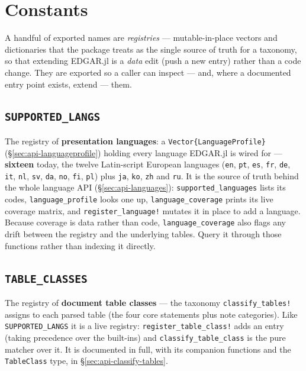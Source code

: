\documentclass[11pt,a4paper]{report}
\begin{document}
\section{Constants}
\label{sec:api-constants}

A handful of exported names are \emph{registries} --- mutable-in-place vectors and dictionaries that the
package treats as the single source of truth for a taxonomy, so that extending EDGAR.jl is a \emph{data} edit
(push a new entry) rather than a code change. They are exported so a caller can inspect --- and, where a
documented entry point exists, extend --- them.

\subsection{\texttt{SUPPORTED\_LANGS}}
\label{sec:api-supported-langs}

\noindent The registry of \textbf{presentation languages}: a \texttt{Vector\{LanguageProfile\}}
(\S\ref{sec:api-languageprofile}) holding every language EDGAR.jl is wired for --- \textbf{sixteen} today, the
twelve Latin-script European languages (\texttt{en}, \texttt{pt}, \texttt{es}, \texttt{fr}, \texttt{de},
\texttt{it}, \texttt{nl}, \texttt{sv}, \texttt{da}, \texttt{no}, \texttt{fi}, \texttt{pl}) plus \texttt{ja},
\texttt{ko}, \texttt{zh} and \texttt{ru}. It is the source of truth behind the whole language API
(\S\ref{sec:api-languages}): \texttt{supported\_languages} lists its codes, \texttt{language\_profile} looks one
up, \texttt{language\_coverage} prints its live coverage matrix, and \texttt{register\_language!} mutates it in
place to add a language. Because coverage is data rather than code, \texttt{language\_coverage} also flags any
drift between the registry and the underlying tables. Query it through those functions rather than indexing it
directly.

\subsection{\texttt{TABLE\_CLASSES}}
\label{sec:api-table-classes}

\noindent The registry of \textbf{document table classes} --- the taxonomy \texttt{classify\_tables!} assigns
to each parsed table (the four core statements plus note categories). Like \texttt{SUPPORTED\_LANGS} it is a
live registry: \texttt{register\_table\_class!} adds an entry (taking precedence over the built-ins) and
\texttt{classify\_table\_class} is the pure matcher over it. It is documented in full, with its companion
functions and the \texttt{TableClass} type, in \S\ref{sec:api-classify-tables}.
\end{document}
